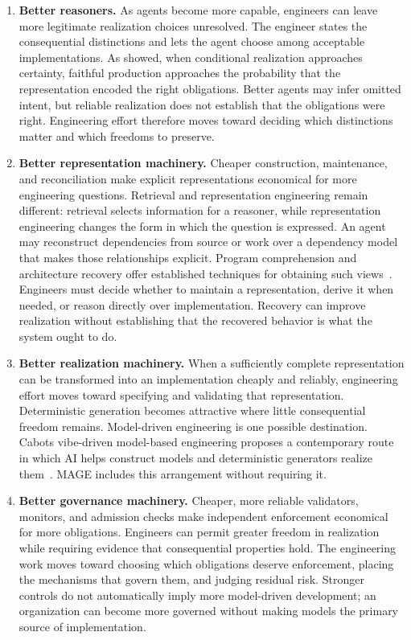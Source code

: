\begin{enumerate}
\item
  \textbf{Better reasoners.} As agents become more capable, engineers can leave more legitimate realization choices unresolved. The engineer states the consequential distinctions and lets the agent choose among acceptable implementations. As  showed, when conditional realization approaches certainty, faithful production approaches the probability that the representation encoded the right obligations. Better agents may infer omitted intent, but reliable realization does not establish that the obligations were right. Engineering effort therefore moves toward deciding which distinctions matter and which freedoms to preserve.
\item
  \textbf{Better representation machinery.} Cheaper construction, maintenance, and reconciliation make explicit representations economical for more engineering questions. Retrieval and representation engineering remain different: retrieval selects information for a reasoner, while representation engineering changes the form in which the question is expressed. An agent may reconstruct dependencies from source or work over a dependency model that makes those relationships explicit. Program comprehension and architecture recovery offer established techniques for obtaining such views~\citep{chikofsky1990taxonomy, ducasse2009architecture, cornelissen2009dynamic}. Engineers must decide whether to maintain a representation, derive it when needed, or reason directly over implementation. Recovery can improve realization without establishing that the recovered behavior is what the system ought to do.
\item
  \textbf{Better realization machinery.} When a sufficiently complete representation can be transformed into an implementation cheaply and reliably, engineering effort moves toward specifying and validating that representation. Deterministic generation becomes attractive where little consequential freedom remains. Model-driven engineering is one possible destination. Cabot\textquotesingle s vibe-driven model-based engineering proposes a contemporary route in which AI helps construct models and deterministic generators realize them~\citep{cabot2026vibe}. MAGE includes this arrangement without requiring it.
\item
  \textbf{Better governance machinery.} Cheaper, more reliable validators, monitors, and admission checks make independent enforcement economical for more obligations. Engineers can permit greater freedom in realization while requiring evidence that consequential properties hold. The engineering work moves toward choosing which obligations deserve enforcement, placing the mechanisms that govern them, and judging residual risk. Stronger controls do not automatically imply more model-driven development; an organization can become more governed without making models the primary source of implementation.
\end{enumerate}

